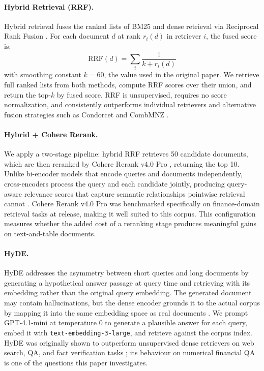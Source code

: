 \documentclass[11pt]{article}
\begin{document}
\paragraph{Hybrid Retrieval (RRF).}
Hybrid retrieval fuses the ranked lists of BM25 and dense retrieval via Reciprocal Rank Fusion \citep{cormack2009rrf}. For each document $d$ at rank $r_i(d)$ in retriever $i$, the fused score is:
\begin{equation}
\text{RRF}(d) = \sum_{i} \frac{1}{k + r_i(d)}
\end{equation}
with smoothing constant $k = 60$, the value used in the original paper. We retrieve full ranked lists from both methods, compute RRF scores over their union, and return the top-$k$ by fused score. RRF is unsupervised, requires no score normalization, and consistently outperforms individual retrievers and alternative fusion strategies such as Condorcet and CombMNZ \citep{cormack2009rrf}.

\paragraph{Hybrid + Cohere Rerank.}
We apply a two-stage pipeline: hybrid RRF retrieves 50 candidate documents, which are then reranked by Cohere Rerank v4.0 Pro \citep{cohere2025rerank4}, returning the top 10. Unlike bi-encoder models that encode queries and documents independently, cross-encoders process the query and each candidate jointly, producing query-aware relevance scores that capture semantic relationships pointwise retrieval cannot \citep{nogueira2019passage}. Cohere Rerank v4.0 Pro was benchmarked specifically on finance-domain retrieval tasks at release, making it well suited to this corpus. This configuration measures whether the added cost of a reranking stage produces meaningful gains on text-and-table documents.

\paragraph{HyDE.}
HyDE \citep{gao2022hyde} addresses the asymmetry between short queries and long documents by generating a hypothetical answer passage at query time and retrieving with its embedding rather than the original query embedding. The generated document may contain hallucinations, but the dense encoder grounds it to the actual corpus by mapping it into the same embedding space as real documents \citep{gao2022hyde}. We prompt GPT-4.1-mini at temperature 0 to generate a plausible answer for each query, embed it with \texttt{text-embedding-3-large}, and retrieve against the corpus index. HyDE was originally shown to outperform unsupervised dense retrievers on web search, QA, and fact verification tasks \citep{gao2022hyde}; its behaviour on numerical financial QA is one of the questions this paper investigates.
\end{document}

